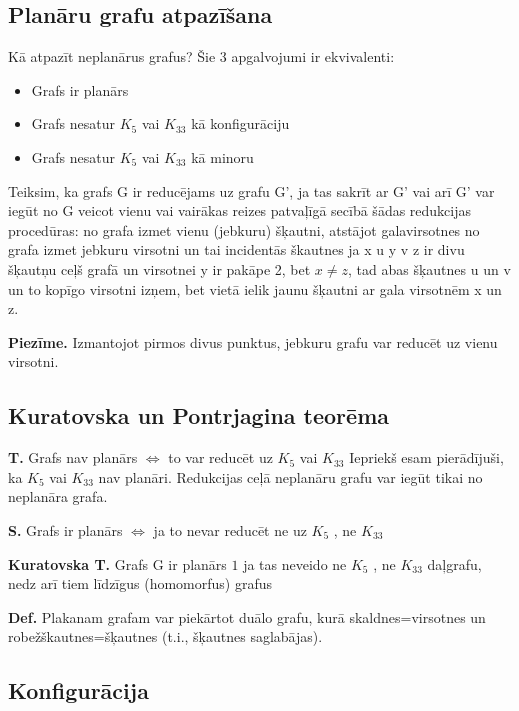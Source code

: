 \documentclass{article}
\begin{document}
\subsection{Planāru grafu atpazīšana}

Kā atpazīt neplanārus grafus?
Šie 3 apgalvojumi ir ekvivalenti:
\begin{itemize}
	\item Grafs ir planārs
	\item Grafs nesatur $K_5$ vai $K_{33}$ kā konfigurāciju
	\item Grafs nesatur $K_5$ vai $K_{33}$ kā minoru
\end{itemize}

Teiksim, ka grafs G ir reducējams uz grafu G', ja tas sakrīt ar G' vai arī G' var iegūt no G veicot vienu vai vairākas reizes patvaļīgā secībā šādas redukcijas procedūras: no grafa izmet vienu (jebkuru) šķautni, atstājot galavirsotnes no grafa izmet jebkuru virsotni un tai incidentās škautnes ja x u y v z ir divu šķautņu ceļš grafā un virsotnei y ir pakāpe 2, bet $x \ne z$, tad abas šķautnes u un v un to kopīgo virsotni izņem, bet vietā ielik jaunu šķautni ar gala virsotnēm x un z.

\textbf{Piezīme.} Izmantojot pirmos divus punktus, jebkuru grafu var reducēt uz vienu virsotni.

\subsection{Kuratovska un Pontrjagina teorēma}

\textbf{T.}  Grafs nav planārs $\Leftrightarrow$ to var reducēt uz $K_5$ vai $K_{33}$ Iepriekš esam pierādījuši, ka $K_5$ vai $K_{33}$ nav planāri.  Redukcijas ceļā neplanāru grafu var iegūt tikai no neplanāra grafa.

\textbf{S. } Grafs ir planārs $\Leftrightarrow$ ja to nevar reducēt ne uz $K_5$ , ne $K_{33}$

\textbf{Kuratovska T.} Grafs G ir planārs $1$ ja tas neveido ne $K_5$ , ne $K_{33}$ daļgrafu, nedz arī tiem līdzīgus (homomorfus) grafus

\textbf{Def.}  Plakanam grafam var piekārtot duālo grafu, kurā skaldnes=virsotnes un robežškautnes=šķautnes (t.i., šķautnes saglabājas).

\subsection{Konfigurācija}
\end{document}
